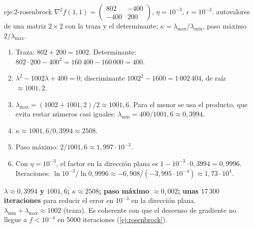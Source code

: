 \begin{solucion}{eje:2-rosenbrock}
\datos $\nabla^{2}f(1,1)=\begin{pmatrix}802&-400\\-400&200\end{pmatrix}$, $\eta=10^{-3}$, $\epsilon=10^{-3}$.
\planteamiento autovalores de una matriz $2\times 2$ con la traza y el determinante; $\kappa=\lambda_{\max}/\lambda_{\min}$, paso máximo $2/\lambda_{\max}$.
\pasos
\begin{enumerate}[label=\arabic*.]
  \item Traza: $802+200=1002$. Determinante: $802\cdot 200-400^{2}=160\,400-160\,000=400$.
  \item $\lambda^{2}-1002\lambda+400=0$; discriminante $1002^{2}-1600=1\,002\,404$, de raíz $\approx 1001{,}2$.
  \item $\lambda_{\max}=(1002+1001{,}2)/2\approx 1001{,}6$. Para el menor se usa el producto, que evita restar números casi iguales: $\lambda_{\min}=400/1001{,}6\approx 0{,}3994$.
  \item $\kappa\approx 1001{,}6/0{,}3994\approx 2508$.
  \item Paso máximo: $2/1001{,}6\approx 1{,}997\cdot 10^{-3}$.
  \item Con $\eta=10^{-3}$, el factor en la dirección plana es $1-10^{-3}\cdot 0{,}3994=0{,}9996$. Iteraciones: $\ln 10^{-3}/\ln 0{,}9996\approx -6{,}908/(-3{,}995\cdot 10^{-4})\approx 1{,}73\cdot 10^{4}$.
\end{enumerate}
\resultado \textbf{$\lambda\approx 0{,}3994$ y $1001{,}6$; $\kappa\approx 2508$; paso máximo $\approx 0{,}002$; unas $17\,300$ iteraciones} para reducir el error en $10^{-3}$ en la dirección plana.
\comprobacion $\lambda_{\min}+\lambda_{\max}\approx 1002$ (traza). Es coherente con que el descenso de gradiente no llegue a $f<10^{-4}$ en 5000 iteraciones (\cref{ej:rosenbrock}).
\end{solucion}

